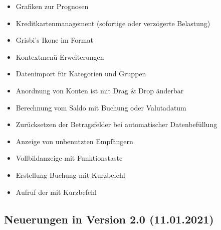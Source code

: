 \begin{itemize}
	\item Grafiken zur Prognosen%
	\item Kreditkartenmanagement (sofortige oder verzögerte Belastung)%
	\item Grisbi's Ikone im Format %
	\item Kontextmenü Erweiterungen%
	\item Datenimport für Kategorien und Gruppen%
	\item Anordnung von Konten ist mit Drag \& Drop änderbar%
	\item Berechnung vom Saldo mit Buchung oder Valutadatum%
	\item Zurücksetzen der Betragsfelder bei automatischer Datenbefüllung%
	\item Anzeige von unbenutzten Empfängern%
	\item Vollbildanzeige mit Funktionstaste %
	\item Erstellung Buchung mit Kurzbefehl %
	\item Aufruf der  mit Kurzbefehl %
\end{itemize}


\subsection{Neuerungen in Version 2.0 \textnormal{(11.01.2021)}}%

